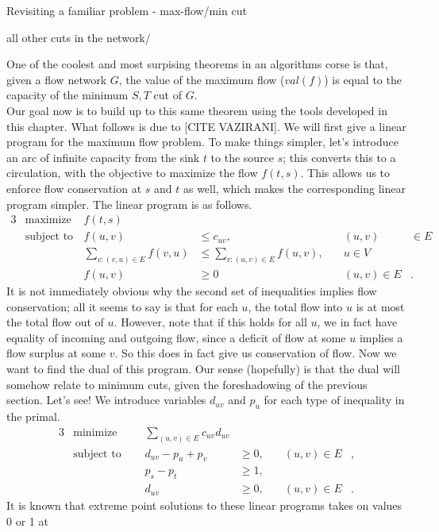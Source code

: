 \documentclass[11pt]{article}
\renewcommand{\'}{^{'}}
\newenvironment{definition}[2][Definition]{\begin{trivlist}
\item[\hskip \labelsep {\bfseries #1}\hskip \labelsep {\bfseries #2.}]}{\end{trivlist}}
\begin{document}
\begin{section}{Revisiting a familiar problem - max-flow/min cut}
\begin{definition}{(Cut)}
		all other cuts in the network/
	\end{definition}
	One of the coolest and most surpising theorems in an algorithms corse is that, given a flow 
	network $G$, the value of the maximum flow ($val(f)$) is equal to the capacity of the minimum 
	$S,T$ cut of $G$.\\
	Our goal now is to build up to this same theorem using the tools developed in this chapter. 
	What follows is due to [CITE VAZIRANI]. We will first give a linear program for the 
	maximum flow problem. To make things simpler, let's introduce an arc of infinite capacity 
	from the sink $t$ to the source $s$; this converts this to a circulation, with the objective to 
	maximize the flow $f(t,s)$. This allows us to enforce flow conservation at $s$ and $t$ as well, 
	which makes the corresponding linear program simpler. The linear program is as follows.
	\begin{alignat*}{3}
		& \text{maximize } & f(t,s)\\
		& \text{subject to } & f(u,v) &\leq c_{uv}, &\quad (u,v)&\in E\\ 
				     && \sum_{v:(v,u)\in E} f(v,u) & \leq \sum_{v:(u,v)\in E} f(u,v), &
				     	\quad u\in V &\\
				     && f(u,v) &\geq 0 &\quad (u,v)\in E &.
	\end{alignat*}
	It is not immediately obvious why the second set of inequalities implies flow conservation; all 
	it seems to say is that for each $u$, the total flow into $u$ is at most the total flow out 
	of $u$. However, note that if this holds for all $u$, we in fact have equality of incoming and 
	outgoing flow, since a deficit of flow at some $u$ implies a flow surplus at some $v$. So 
	this does in fact give us conservation of flow. Now we want to find the dual of this program. 
	Our sense (hopefully) is that the dual will somehow relate to minimum cuts, given the 
	foreshadowing of the previous section. Let's see! We introduce variables $d_{uv}$ and $p_u$ for 
	each type of inequality in the primal.
	\begin{alignat}{3}
		& \text{minimize } & \sum_{(u,v)\in E} c_{uv} d_{uv}& \\
		& \text{subject to } \quad & d_{uv} - p_u + p_v & \geq 0, & \quad (u,v)\in E &, \\
				    && p_s - p_t & \geq 1, & \\
				    && d_{uv} & \geq 0, & \quad (u,v) \in E &.
	\end{alignat}
	It is known that extreme point solutions to these linear programs takes on values 0 or 1 at 

\end{section}
\end{document}
